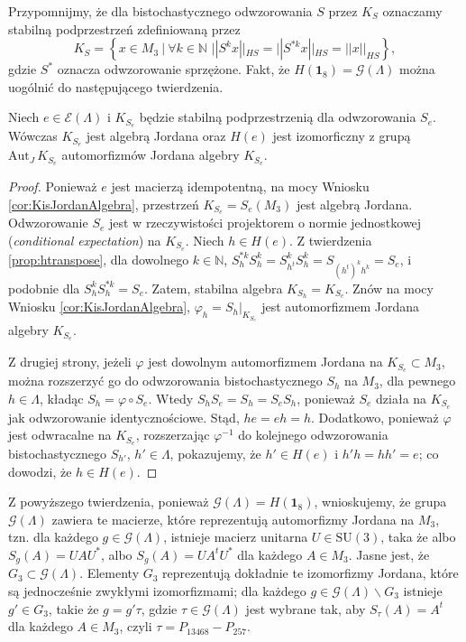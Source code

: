 {Przypomnijmy, że dla  bistochastycznego odwzorowania $S$
przez $K_{S}$ oznaczamy stabilną podprzestrzeń zdefiniowaną przez
\begin{equation}
    K_{S} = \left \{ x \in M_{3} \:|\:
            \forall k \in \mathbb{N} \,\,
            || S^{k} x ||_{HS} = || S^{*k} x ||_{HS} =  ||x||_{HS}
    \right \},
\end{equation}
gdzie $S^{*}$ oznacza odwzorowanie sprzężone.
Fakt, że $H(\mathbf{1}_{8}) = \mathcal{G}(\Lambda)$
można uogólnić do następującego twierdzenia.
\begin{Theorem}
    Niech $e \in \mathcal{E}(\Lambda)$ i
    $K_{S_{e}}$ będzie stabilną podprzestrzenią dla odwzorowania $S_{e}$.
    Wówczas $K_{S_{e}}$ jest algebrą Jordana oraz
    $H(e)$ jest izomorficzny z grupą $\text{Aut}_{J} \, K_{S_{e}}$
    automorfizmów Jordana algebry $K_{S_{e}}$.
\end{Theorem}

\begin{proof}
Ponieważ $e$ jest macierzą idempotentną, na mocy
Wniosku \ref{cor:KisJordanAlgebra},
przestrzeń $K_{S_{e}} = S_{e}(M_{3})$ jest algebrą Jordana.
Odwzorowanie $S_{e}$ jest w rzeczywistości
projektorem o normie jednostkowej (\emph{conditional expectation})
na $K_{S_{e}}$.
Niech $h \in H(e)$.
Z twierdzenia \ref{prop:htranspose}, dla dowolnego $k\in \mathbb{N}$,
$S_{h}^{* k} S_{h}^{k} = S_{h^{t}}^{k} S_{h}^{k} =  S_{(h^{t})^{k} h^{k}} = S_{e}$,
i podobnie dla $S_{h}^{k} S_{h}^{* k}= S_{e}$.
Zatem, stabilna algebra $K_{S_{h}} = K_{S_{e}}$.
Znów na mocy Wniosku \ref{cor:KisJordanAlgebra},
$\varphi_{h} = S_{h} \big |_{K_{S_{e}}}$
jest automorfizmem Jordana algebry $K_{S_{e}}$.

Z drugiej strony, jeżeli $\varphi$ jest dowolnym automorfizmem Jordana na
$K_{S_{e}} \subset M_{3}$,
można rozszerzyć go do odwzorowania bistochastycznego $S_{h}$ na $M_{3}$,
dla pewnego $h \in \Lambda$,
kładąc $S_{h} = \varphi \circ S_{e}$.
Wtedy
    $S_{h} S_{e} = S_{h} = S_{e} S_{h}$,
ponieważ $S_{e}$ działa na $K_{S_{e}}$ jak odwzorowanie identycznościowe.
Stąd, $he = eh = h$.
Dodatkowo, ponieważ $\varphi$ jest odwracalne na $K_{S_{e}}$,
rozszerzając $\varphi^{-1}$ do kolejnego odwzorowania bistochastycznego
    $S_{h'}$,  $h' \in \Lambda$,
pokazujemy, że $h' \in H(e)$ i $h' h = h h' = e$;
co dowodzi, że $h \in H(e)$.
\end{proof}
\begin{Remark}
Z powyższego twierdzenia, ponieważ $\mathcal{G}(\Lambda) = H(\mathbf{1}_{8})$,
wnioskujemy, że grupa $\mathcal{G}(\Lambda)$ zawiera te macierze,
które reprezentują automorfizmy Jordana na $M_{3}$,
tzn. dla każdego $g \in \mathcal{G}(\Lambda)$,
istnieje macierz unitarna $U \in \text{SU}(3)$, taka że
albo $S_{g}(A) = U A U^{*}$, albo $S_{g}(A) = U A^{t} U^{*}$
dla każdego $A \in M_{3}$.
Jasne jest, że $G_{3} \subset \mathcal{G}(\Lambda)$.
Elementy $G_{3}$ reprezentują dokładnie te izomorfizmy Jordana,
które są jednocześnie zwykłymi izomorfizmami;
dla każdego $g \in \mathcal{G}(\Lambda) \backslash G_{3}$ istnieje
$g' \in G_{3}$, takie że $g = g' \tau$,
gdzie $\tau \in \mathcal{G}(\Lambda)$ jest wybrane tak, aby
$S_{\tau}(A) = A^{t}$ dla każdego $A \in M_{3}$,
czyli
$\tau = P_{13468} - P_{257}$.
\end{Remark}

}
